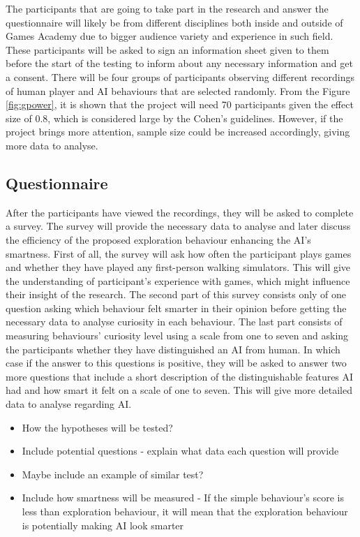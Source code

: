 \documentclass[journal]{IEEEtran}
\begin{document}
The participants that are going to take part in the research and answer the questionnaire will likely be from different disciplines both inside and outside of Games Academy due to bigger audience variety and experience in such field. These participants will be asked to sign an information sheet given to them before the start of the testing to inform about any necessary information and get a consent. There will be four groups of participants observing different recordings of human player and AI behaviours that are selected randomly. From the Figure \ref{fig:gpower}, it is shown that the project will need 70 participants given the effect size of 0.8, which is considered large by the Cohen's guidelines. However, if the project brings more attention, sample size could be increased accordingly, giving more data to analyse.

\subsection{Questionnaire}
After the participants have viewed the recordings, they will be asked to complete a survey. The survey will provide the necessary data to analyse and later discuss the efficiency of the proposed exploration behaviour enhancing the AI's smartness. First of all, the survey will ask how often the participant plays games and whether they have played any first-person walking simulators. This will give the understanding of participant's experience with games, which might influence their insight of the research. The second part of this survey consists only of one question asking which behaviour felt smarter in their opinion before getting the necessary data to analyse curiosity in each behaviour. The last part consists of measuring behaviours' curiosity level using a scale from one to seven and asking the participants whether they have distinguished an AI from human. In which case if the answer to this questions is positive, they will be asked to answer two more questions that include a short description of the distinguishable features AI had and how smart it felt on a scale of one to seven. This will give more detailed data to analyse regarding AI.

\begin{itemize}
	\item How the hypotheses will be tested?
	\item Include potential questions - explain what data each question will provide
	\item Maybe include an example of similar test?
	\item Include how smartness will be measured - If the simple behaviour's score is less than exploration behaviour, it will mean that the exploration behaviour is potentially making AI look smarter
\end{itemize}
\end{document}
